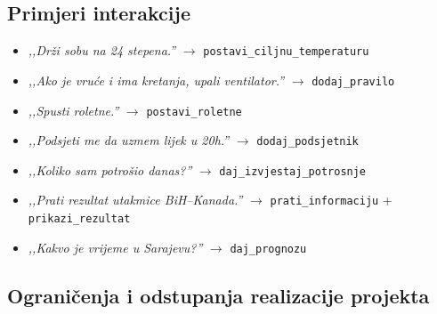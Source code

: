 \documentclass[11pt,a4paper]{article}
\begin{document}
\subsection{Primjeri interakcije}
\begin{itemize}[nosep]
      \item \emph{,,Drži sobu na 24 stepena.''} $\rightarrow$ \texttt{postavi\_ciljnu\_temperaturu}
      \item \emph{,,Ako je vruće i ima kretanja, upali ventilator.''} $\rightarrow$ \texttt{dodaj\_pravilo}
      \item \emph{,,Spusti roletne.''} $\rightarrow$ \texttt{postavi\_roletne}
      \item \emph{,,Podsjeti me da uzmem lijek u 20h.''} $\rightarrow$ \texttt{dodaj\_podsjetnik}
      \item \emph{,,Koliko sam potrošio danas?''} $\rightarrow$ \texttt{daj\_izvjestaj\_potrosnje}
      \item \emph{,,Prati rezultat utakmice BiH--Kanada.''} $\rightarrow$ \texttt{prati\_informaciju} + \texttt{prikazi\_rezultat}
      \item \emph{,,Kakvo je vrijeme u Sarajevu?''} $\rightarrow$ \texttt{daj\_prognozu}
\end{itemize}

\subsection{Ograničenja i odstupanja realizacije projekta}
\end{document}
